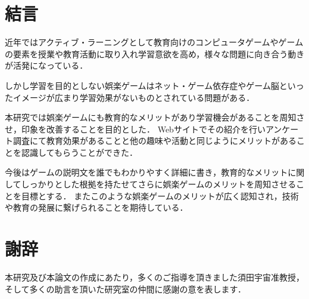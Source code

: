 \documentclass[12pt,a4j,titlepage]{ltjsarticle}
\begin{document}
\clearpage
\section{結言}
近年ではアクティブ・ラーニングとして教育向けのコンピュータゲームやゲームの要素を授業や教育活動に取り入れ学習意欲を高め，様々な問題に向き合う動きが活発になっている．

しかし学習を目的としない娯楽ゲームはネット・ゲーム依存症やゲーム脳といったイメージが広まり学習効果がないものとされている問題がある．

本研究では娯楽ゲームにも教育的なメリットがあり学習機会があることを周知させ，印象を改善することを目的とした．
Webサイトでその紹介を行いアンケート調査にて教育効果があることと他の趣味や活動と同じようにメリットがあることを認識してもらうことができた．

今後はゲームの説明文を誰でもわかりやすく詳細に書き，教育的なメリットに関してしっかりとした根拠を持たせてさらに娯楽ゲームのメリットを周知させることを目標とする．
またこのような娯楽ゲームのメリットが広く認知され，技術や教育の発展に繋げられることを期待している．

\clearpage
\section{謝辞}
本研究及び本論文の作成にあたり，多くのご指導を頂きました須田宇宙准教授，そして多くの助言を頂いた研究室の仲間に感謝の意を表します．
\end{document}
